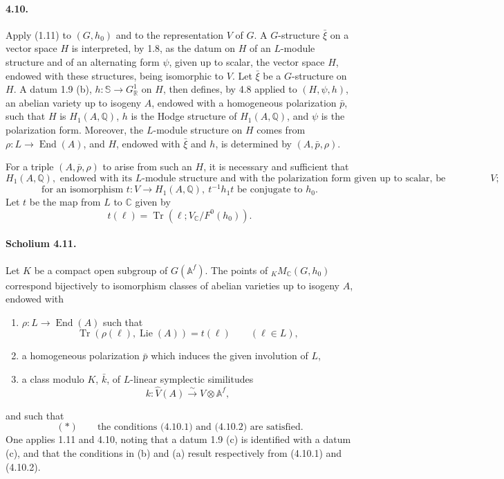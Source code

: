 \documentclass[10pt]{article}
\newcommand{\Af}{\mathbb A^f}
\newcommand{\C}{\mathbb C}
\newcommand{\Q}{\mathbb Q}
\newcommand{\R}{\mathbb R}
\newcommand{\bS}{\mathbb S}
\newcommand{\Lie}{\operatorname{Lie}}
\newcommand{\End}{\operatorname{End}}
\newcommand{\Tr}{\operatorname{Tr}}
\begin{document}
\paragraph{4.10.} Apply (1.11) to $(G,h_0)$ and to the representation $V$ of $G$. A $G$-structure $\bar\xi$ on a vector space $H$ is interpreted, by 1.8, as the datum on $H$ of an $L$-module structure and of an alternating form $\psi$, given up to scalar, the vector space $H$, endowed with these structures, being isomorphic to $V$. Let $\bar\xi$ be a $G$-structure on $H$. A datum 1.9 (b), $h:\bS\to G^1_\R$ on $H$, then defines, by 4.8 applied to $(H,\psi,h)$, an abelian variety up to isogeny $A$, endowed with a homogeneous polarization $\bar p$, such that $H$ is $H_1(A,\Q)$, $h$ is the Hodge structure of $H_1(A,\Q)$, and $\psi$ is the polarization form. Moreover, the $L$-module structure on $H$ comes from $\rho:L\to\End(A)$, and $H$, endowed with $\bar\xi$ and $h$, is determined by $(A,\bar p,\rho)$.

For a triple $(A,\bar p,\rho)$ to arise from such an $H$, it is necessary and sufficient that
\[
\tag{4.10.1}
H_1(A,\Q),\text{ endowed with its }L\text{-module structure and with the polarization form given up to scalar, be isomorphic to }V;
\]
\[
\tag{4.10.2}
\text{for an isomorphism }t:V\longrightarrow H_1(A,\Q),\ t^{-1}h_1t\text{ be conjugate to }h_0.
\]
Let $t$ be the map from $L$ to $\C$ given by
\[
\tag{4.10.3}
t(\ell)=\Tr(\ell;V_\C/F^0(h_0)).
\]

\paragraph{Scholium 4.11.} Let $K$ be a compact open subgroup of $G(\Af)$. The points of ${}_K M_{\C}(G,h_0)$ correspond bijectively to isomorphism classes of abelian varieties up to isogeny $A$, endowed with
\begin{enumerate}[label=(\alph*)]
\item $\rho:L\to\End(A)$ such that
\[
\Tr(\rho(\ell),\Lie(A))=t(\ell)\qquad(\ell\in L),
\]
\item a homogeneous polarization $\bar p$ which induces the given involution of $L$,
\item a class modulo $K$, $\bar k$, of $L$-linear symplectic similitudes
\[
k:\widehat V(A)\xrightarrow{\sim}V\otimes\Af,
\]
\end{enumerate}
and such that
\[
(*)\qquad\text{the conditions (4.10.1) and (4.10.2) are satisfied.}
\]
One applies 1.11 and 4.10, noting that a datum 1.9 (c) is identified with a datum (c), and that the conditions in (b) and (a) result respectively from (4.10.1) and (4.10.2).
\end{document}
